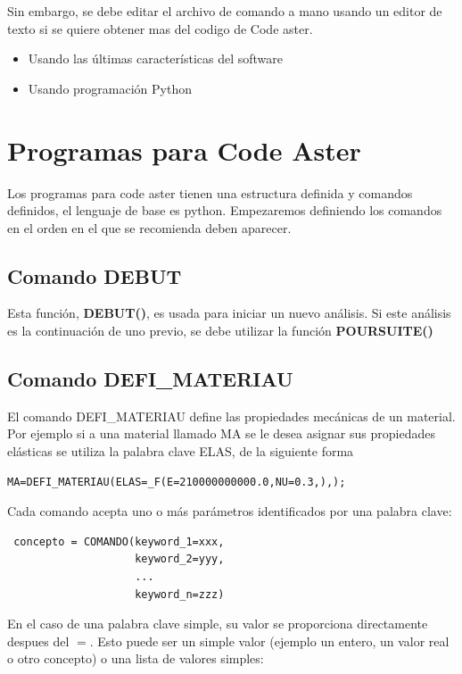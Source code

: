 \documentclass[12pt]{book}
\theoremstyle{definition}
\theoremstyle{remark}
\theoremstyle{plain}
\begin{document}
Sin embargo, se debe editar el archivo de comando a mano usando un editor
de texto si se quiere obtener mas del codigo de Code aster.
\begin{itemize}
 \item Usando las últimas características del software
 \item Usando programación Python
\end{itemize}

\section{Programas para Code Aster }

Los programas para code aster tienen una estructura definida y comandos definidos,
el lenguaje de base es python. Empezaremos definiendo los comandos en el orden 
en el que se recomienda deben aparecer.

\subsection{Comando DEBUT}

Esta función, \textbf{DEBUT()}, es usada para iniciar un nuevo análisis. Si este análisis es la 
continuación de uno previo, se debe utilizar la función \textbf{POURSUITE()}

\subsection{Comando DEFI\_MATERIAU}

El comando DEFI\_MATERIAU define las propiedades mecánicas de un material. Por ejemplo
si a una material llamado MA se le desea asignar sus propiedades elásticas se utiliza 
la palabra clave ELAS, de la siguiente forma

\begin{verbatim}
MA=DEFI_MATERIAU(ELAS=_F(E=210000000000.0,NU=0.3,),);
\end{verbatim}

Cada comando acepta uno o más parámetros identificados por una palabra clave:

\begin{verbatim}
 concepto = COMANDO(keyword_1=xxx,
                    keyword_2=yyy,
                    ...
                    keyword_n=zzz)
\end{verbatim}

En el caso de una palabra clave simple, su valor se proporciona directamente
despues del $=$. Esto puede ser un simple valor (ejemplo un entero, un valor real o
otro concepto) o una lista de valores simples:
\end{document}
